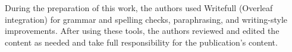 \documentclass[sigconf]{acmart}
\begin{document}
\begin{acks}
During the preparation of this work, the authors used Writefull
(Overleaf integration) for grammar and spelling checks, paraphrasing,
and writing-style improvements.
After using these tools, the authors reviewed and edited the content as
needed and take full responsibility for the publication's content.
\end{acks}



\end{document}
